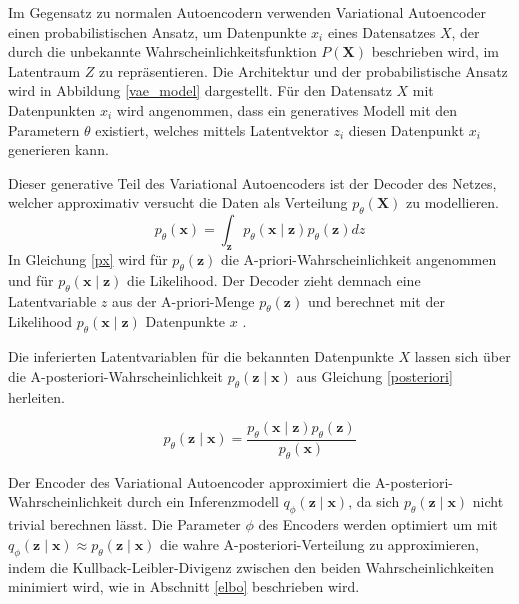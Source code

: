 Im Gegensatz zu normalen Autoencodern verwenden Variational Autoencoder einen probabilistischen Ansatz, um Datenpunkte $x_i$ eines Datensatzes $X$, der durch die unbekannte Wahrscheinlichkeitsfunktion $P(\mathbf{X})$ beschrieben wird, im Latentraum $Z$ zu repräsentieren. 
Die Architektur und der probabilistische Ansatz wird in Abbildung \ref{vae_model} dargestellt.
Für den Datensatz $X$ mit Datenpunkten $x_i$ wird angenommen, dass ein generatives Modell mit den Parametern $\theta$ existiert, welches mittels Latentvektor $z_i$ diesen Datenpunkt $x_i$ generieren kann.

Dieser generative Teil des Variational Autoencoders ist der Decoder des  Netzes, welcher approximativ versucht die Daten als Verteilung $p_\theta (\mathbf{X})$ zu modellieren.
\begin{equation}
    \label{px}
p_\theta (\mathbf{x}) = \int_{\mathbf{z}} p_\theta (\mathbf{x\mid z}) p_\theta (\mathbf{z}) dz
\end{equation}
In Gleichung \ref{px} wird für $p_\theta (\mathbf{z})$ die A-priori-Wahrscheinlichkeit angenommen und für $p_\theta (\mathbf{x\mid z})$ die Likelihood. Der Decoder zieht demnach eine Latentvariable $z$ aus der A-priori-Menge $p_\theta (\mathbf{z})$ und berechnet mit der Likelihood $p_\theta (\mathbf{x\mid z})$ Datenpunkte $x$ \citep{vae2}.

Die inferierten Latentvariablen für die bekannten Datenpunkte $X$ lassen sich über die A-posteriori-Wahrscheinlichkeit $p_\theta (\mathbf{z\mid x})$ aus Gleichung \ref{posteriori} herleiten. 

\begin{equation}
    \label{posteriori}
    p_\theta (\mathbf{z\mid x}) = \frac{p_\theta (\mathbf{x\mid z}) p_\theta (\mathbf{z})}{p_\theta(\mathbf{x})}
\end{equation}

Der Encoder des Variational Autoencoder approximiert die A-posteriori-Wahrscheinlichkeit durch ein Inferenzmodell $q_\phi (\mathbf{z\mid x})$, da sich $p_\theta (\mathbf{z\mid x})$ nicht trivial berechnen lässt.
Die Parameter $\phi$ des Encoders werden optimiert um mit $q_\phi (\mathbf{z\mid x}) \approx p_\theta (\mathbf{z\mid x})$ die wahre A-posteriori-Verteilung zu approximieren, indem die Kullback-Leibler-Divigenz zwischen den beiden Wahrscheinlichkeiten minimiert wird, wie in Abschnitt \ref{elbo} beschrieben wird.




